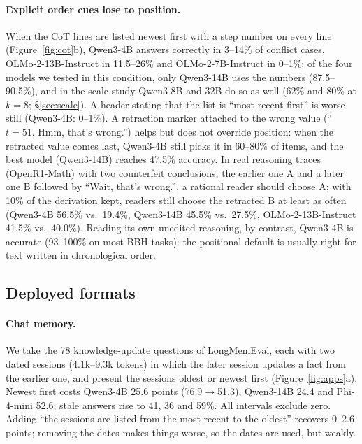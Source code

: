 \documentclass[11pt]{article}
\begin{document}
\paragraph{Explicit order cues lose to position.}
When the CoT lines are listed newest first with a step number on every line (Figure~\ref{fig:cot}b), Qwen3-4B answers correctly in 3--14\% of conflict cases, OLMo-2-13B-Instruct in 11.5--26\% and OLMo-2-7B-Instruct in 0--1\%; of the four models we tested in this condition, only Qwen3-14B uses the numbers (87.5--90.5\%), and in the scale study Qwen3-8B and 32B do so as well (62\% and 80\% at $k=8$; \S\ref{sec:scale}).
A header stating that the list is ``most recent first'' is worse still (Qwen3-4B: 0--1\%).
A retraction marker attached to the wrong value (``$t = 51$. Hmm, that's wrong.'') helps but does not override position: when the retracted value comes last, Qwen3-4B still picks it in 60--80\% of items, and the best model (Qwen3-14B) reaches 47.5\% accuracy.
In real reasoning traces (OpenR1-Math) with two counterfeit conclusions, the earlier one A and a later one B followed by ``Wait, that's wrong.'', a rational reader should choose A; with 10\% of the derivation kept, readers still choose the retracted B at least as often (Qwen3-4B 56.5\% vs.\ 19.4\%, Qwen3-14B 45.5\% vs.\ 27.5\%, OLMo-2-13B-Instruct 41.5\% vs.\ 40.0\%).
Reading its own unedited reasoning, by contrast, Qwen3-4B is accurate (93--100\% on most BBH tasks): the positional default is usually right for text written in chronological order.

\subsection{Deployed formats}
\label{sec:apps}

\paragraph{Chat memory.}
We take the 78 knowledge-update questions of LongMemEval, each with two dated sessions (4.1k--9.3k tokens) in which the later session updates a fact from the earlier one, and present the sessions oldest or newest first (Figure~\ref{fig:apps}a).
Newest first costs Qwen3-4B 25.6 points (76.9$\rightarrow$51.3), Qwen3-14B 24.4 and Phi-4-mini 52.6; stale answers rise to 41, 36 and 59\%. All intervals exclude zero.
Adding ``the sessions are listed from the most recent to the oldest'' recovers 0--2.6 points; removing the dates makes things worse, so the dates are used, but weakly.
\end{document}
